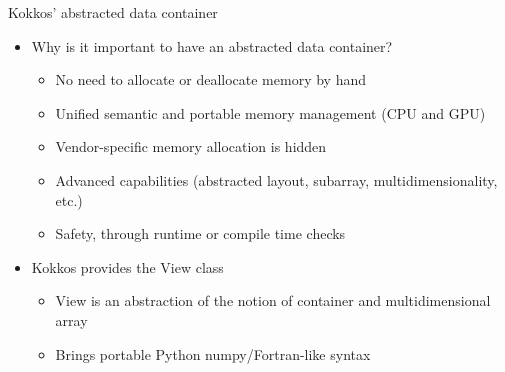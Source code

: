 \documentclass[
    aspectratio=169,
    \createHandout
]{beamer}
\begin{document}
\begin{frame}[fragile]{Kokkos' abstracted data container}
    \begin{itemize}
        \item Why is it important to have an abstracted data container?
        \begin{itemize}
            \item<1-> No need to allocate or deallocate memory by hand
            \item<2-> Unified semantic and portable memory management (CPU and GPU)
            \item<3-> Vendor-specific memory allocation is hidden
            \item<4-> Advanced capabilities (abstracted layout, subarray, multidimensionality, etc.)
            \item<5-> Safety, through runtime or compile time checks
        \end{itemize}
        \item<6-> Kokkos provides the View class
        \begin{itemize}
            \item<7-> View is an abstraction of the notion of container and multidimensional array
            \item<8-> Brings portable Python numpy/Fortran-like syntax
        \end{itemize}
    \end{itemize}
\end{frame}

\end{document}

